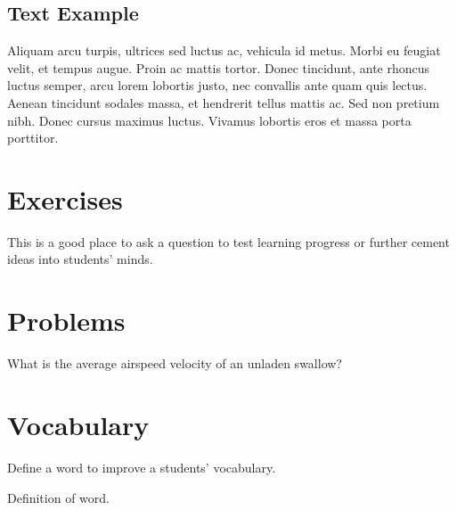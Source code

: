 \subsection{Text Example}

\begin{example}[Example name] %
	Aliquam arcu turpis, ultrices sed luctus ac, vehicula id metus. Morbi eu feugiat velit, et tempus augue. Proin ac mattis tortor. Donec tincidunt, ante rhoncus luctus semper, arcu lorem lobortis justo, nec convallis ante quam quis lectus. Aenean tincidunt sodales massa, et hendrerit tellus mattis ac. Sed non pretium nibh. Donec cursus maximus luctus. Vivamus lobortis eros et massa porta porttitor.
\end{example}


\section{Exercises}

\begin{exercise} %
	This is a good place to ask a question to test learning progress or further cement ideas into students' minds.
\end{exercise}


\section{Problems}

\begin{problem} %
	What is the average airspeed velocity of an unladen swallow?
\end{problem}


\section{Vocabulary}

Define a word to improve a students' vocabulary.

\begin{vocabulary}[Word] %
	Definition of word.
\end{vocabulary}

